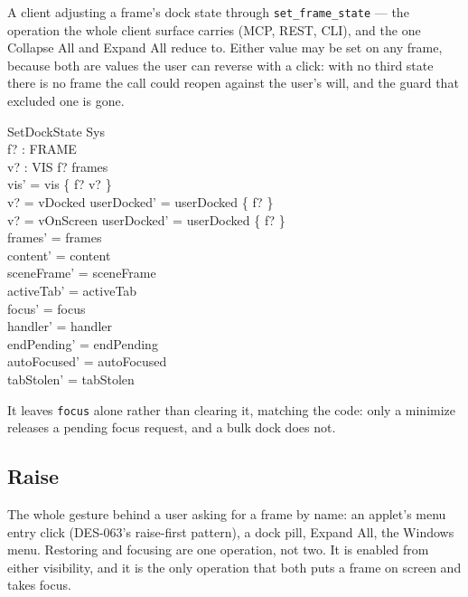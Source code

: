 \documentclass[a4paper,10pt,fleqn]{article}
\begin{document}
A client adjusting a frame's dock state through \texttt{set\_frame\_state} ---
the operation the whole client surface carries (MCP, REST, CLI), and the one
Collapse All and Expand All reduce to.  Either value may be set on any frame,
because both are values the user can reverse with a click: with no third state
there is no frame the call could reopen against the user's will, and the guard
that excluded one is gone.

\begin{schema}{SetDockState}
  \Delta Sys \\
  f? : FRAME \\
  v? : VIS
\where
  f? \in frames \\
  vis' = vis \oplus \{ f? \mapsto v? \} \\
  v? = vDocked \implies userDocked' = userDocked \cup \{ f? \} \\
  v? = vOnScreen \implies userDocked' = userDocked \setminus \{ f? \} \\
  frames' = frames \\
  content' = content \\
  sceneFrame' = sceneFrame \\
  activeTab' = activeTab \\
  focus' = focus \\
  handler' = handler \\
  endPending' = endPending \\
  autoFocused' = autoFocused \\
  tabStolen' = tabStolen
\end{schema}

It leaves \texttt{focus} alone rather than clearing it, matching the code: only
a minimize releases a pending focus request, and a bulk dock does not.

\subsection{Raise}

The whole gesture behind a user asking for a frame by name: an applet's menu
entry click (DES-063's raise-first pattern), a dock pill, Expand All, the
Windows menu.  Restoring and focusing are one operation, not two.  It is
enabled from either visibility, and it is the only operation that both puts a
frame on screen and takes focus.
\end{document}
